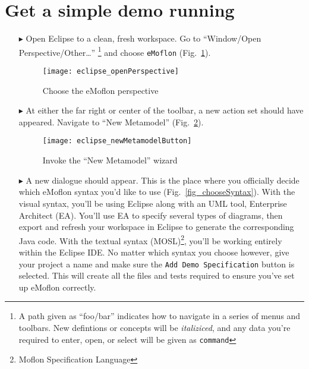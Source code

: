 \newpage
\genHeader

\section{Get a simple demo running}


\begin{itemize}
\hypertarget{simpleDemo common}{} 
\item[$\blacktriangleright$] Open Eclipse to a clean, fresh workspace. Go to ``Window/Open Perspective/Other\ldots'' \footnote{A path given as ``foo/bar''
indicates how to navigate in a series of menus and toolbars. New defintions or concepts will be \emph{italiziced}, and any data you're required to enter, open,
or select will be given as \texttt{command}} and choose \texttt{eMoflon} (Fig.~\ref{fig_eclipse}).

\begin{figure}[htbp]
	\centering
  \texttt{[image: eclipse\_openPerspective]}
	\caption{Choose the eMoflon perspective}
	\label{fig_eclipse}
\end{figure} 

\item[$\blacktriangleright$] At either the far right or center of the toolbar, a new action set should have appeared. Navigate to ``New Metamodel''
(Fig.~\ref{fig_eclipseNewMetamodelButton}).

\vspace{0.5cm}
\begin{figure}[htbp]
	\centering
  \texttt{[image: eclipse\_newMetamodelButton]}
	\caption{Invoke the ``New Metamodel'' wizard}
	\label{fig_eclipseNewMetamodelButton}
\end{figure}

\newpage
\item[$\blacktriangleright$] A new dialogue should appear. This is the place where you officially decide which eMoflon syntax you'd like to use
(Fig.~\ref{fig_chooseSyntax}). With the visual syntax, you'll be using Eclipse along with an UML tool, Enterprise Architect (EA). You'll use EA to specify
several types of diagrams, then export and refresh your workspace in Eclipse to generate the corresponding Java code. With the textual syntax
(MOSL)\footnote{Moflon Specification Language}, you'll be working entirely within the Eclipse IDE. No matter which syntax you choose however, give your project
a name and make sure the \texttt{Add Demo Specification} button is selected. This will create all the files and tests required to ensure you've set up eMoflon correctly.


\end{itemize}

